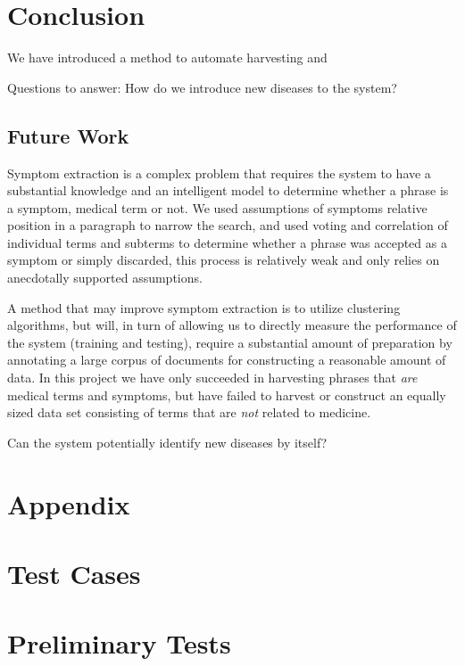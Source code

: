 \documentclass[10pt,letterpaper,final]{article}
\begin{document}
\section{Conclusion}
We have introduced a method to automate harvesting and 

Questions to answer: How do we introduce new diseases to the system?


\subsection{Future Work}
Symptom extraction is a complex problem that requires the system to have
a substantial knowledge and an intelligent model to determine whether a
phrase is a symptom, medical term or not. We used assumptions of
symptoms relative position in a paragraph to narrow the search, and used
voting and correlation of individual terms and subterms to determine
whether a phrase was accepted as a symptom or simply discarded, this
process is relatively weak and only relies on anecdotally supported
assumptions.

A method that may improve symptom extraction is to utilize clustering
algorithms, but will, in turn of allowing us to directly measure the
performance of the system (training and testing), require a substantial
amount of preparation by annotating a large corpus of documents for
constructing a reasonable amount of data. In this project we have only
succeeded in harvesting phrases that \textit{are} medical terms and
symptoms, but have failed to harvest or construct an equally sized data
set consisting of terms that are \textit{not} related to medicine.

Can the system potentially identify new diseases by itself?

\renewcommand\bibname{References}



\appendix
\section{Appendix}
\label{app:orphanet}

\section{Test Cases}

\section{Preliminary Tests}
\label{app:preliminary_results}
\end{document}
